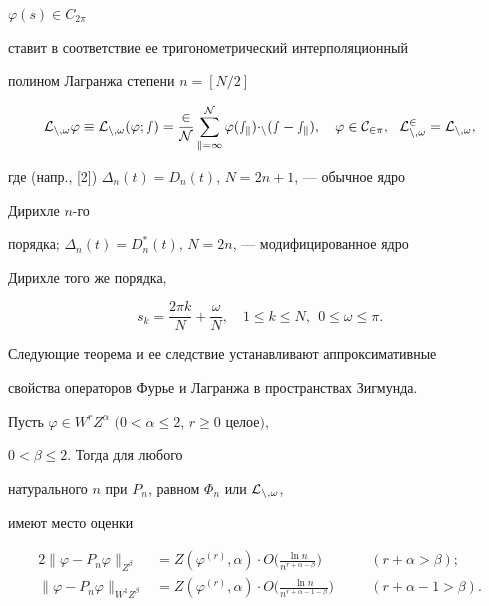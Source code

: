 $\varphi(s)\in C_{2\pi}$ 


ставит в соответствие ее тригонометрический интерполяционный 


полином Лагранжа степени $n=[N/2]$ 


\begin{equation} 


\cal L_{n,\omega}\varphi\equiv\cal L_{n,\omega}(\varphi;s)= 


\frac{2}{N}\sum^N_{k=1}\varphi(s_k)\Delta_n(s-s_k),\quad 


\varphi\in C_{2\pi},\ \ \cal L^2_{n,\omega}=\cal L_{n,\omega}, 


\end{equation} 


где (напр., [2]) $\Delta_n(t)=D_n(t)$, $N=2n+1$, --- обычное ядро 


Дирихле $n$-го 


порядка; $\Delta_n(t)=D^*_n(t)$, $N=2n$, --- модифицированное ядро 


Дирихле того же порядка, 


\begin{equation} 


s_k=\frac{2\pi k}{N}+\frac{\omega}{N},\quad 


1\le k\le N,\ \ 0\le\omega\le\pi. 


\end{equation} 


 


Следующие теорема и ее следствие устанавливают аппроксимативные 


свойства операторов Фурье и Лагранжа в пространствах Зигмунда. 


 


\begin{thm} 


Пусть $\varphi\in W^r Z^\alpha$ $(0<\alpha\le2$, $r\ge0$ целое$)$, 


$0<\beta\le2$. Тогда для любого 


натурального $n$ при $P_n$, равном $\Phi_n$ или $\cal L_{n,\omega}$, 


имеют место оценки 


\begin{alignat*}{2} 


\|\varphi-P_n\varphi\|_{Z^\beta}&=Z(\varphi^{(r)},\alpha)\cdot 


O\bigg(\frac{\ln n}{n^{r+\alpha-\beta}} \bigg) 


&\quad &(r+\alpha>\beta); \\ 


% 


\|\varphi-P_n\varphi\|_{W^1Z^\beta}&=Z(\varphi^{(r)},\alpha)\cdot 


O\bigg(\frac{\ln n}{n^{r+\alpha-1-\beta}} \bigg) 


&\quad &(r+\alpha-1>\beta). 


\end{alignat*} 


\end{thm} 



